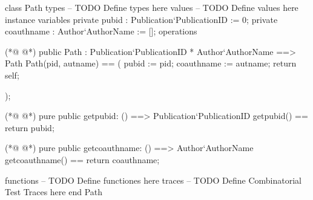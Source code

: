 \begin{vdmpp}[breaklines=true]
class Path
types
-- TODO Define types here
values
-- TODO Define values here
instance variables
private pubid : Publication`PublicationID := 0;
private coauthname : Author`AuthorName := [];
operations

(*@
\label{Path:11}
@*)
 public Path : Publication`PublicationID * Author`AuthorName  ==> Path
  Path(pid, autname) ==
  (
  pubid := pid;
  coauthname := autname;
  return self;
  
  );

(*@
\label{getpubid:20}
@*)
pure public getpubid: () ==> Publication`PublicationID
   getpubid() == return pubid;
   
(*@
\label{getcoauthname:23}
@*)
  pure public getcoauthname: () ==> Author`AuthorName
   getcoauthname() == return coauthname;

functions
-- TODO Define functiones here
traces
-- TODO Define Combinatorial Test Traces here
end Path
\end{vdmpp}
